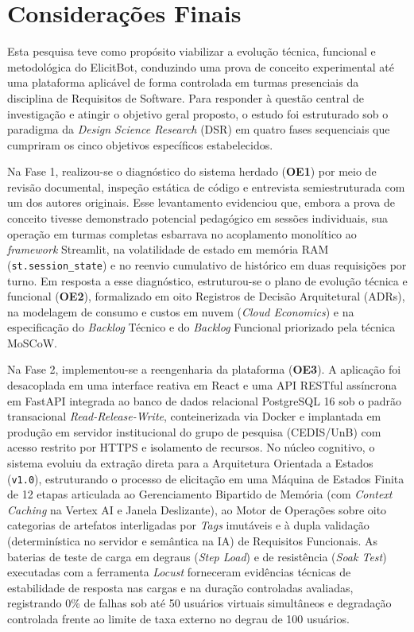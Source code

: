\chapter{Considerações Finais}
\label{cap:consideracoes_finais}

Esta pesquisa teve como propósito viabilizar a evolução técnica, funcional e metodológica do ElicitBot, conduzindo uma prova de conceito experimental até uma plataforma aplicável de forma controlada em turmas presenciais da disciplina de Requisitos de Software. Para responder à questão central de investigação e atingir o objetivo geral proposto, o estudo foi estruturado sob o paradigma da \textit{Design Science Research} (DSR) em quatro fases sequenciais que cumpriram os cinco objetivos específicos estabelecidos.

Na Fase 1, realizou-se o diagnóstico do sistema herdado (\textbf{OE1}) por meio de revisão documental, inspeção estática de código e entrevista semiestruturada com um dos autores originais. Esse levantamento evidenciou que, embora a prova de conceito tivesse demonstrado potencial pedagógico em sessões individuais, sua operação em turmas completas esbarrava no acoplamento monolítico ao \textit{framework} Streamlit, na volatilidade de estado em memória RAM (\texttt{st.session\_\allowbreak state}) e no reenvio cumulativo de histórico em duas requisições por turno. Em resposta a esse diagnóstico, estruturou-se o plano de evolução técnica e funcional (\textbf{OE2}), formalizado em oito Registros de Decisão Arquitetural (ADRs), na modelagem de consumo e custos em nuvem (\textit{Cloud Economics}) e na especificação do \textit{Backlog} Técnico e do \textit{Backlog} Funcional priorizado pela técnica MoSCoW.

Na Fase 2, implementou-se a reengenharia da plataforma (\textbf{OE3}). A aplicação foi desacoplada em uma interface reativa em React e uma API RESTful assíncrona em FastAPI integrada ao banco de dados relacional PostgreSQL 16 sob o padrão transacional \textit{Read-Release-Write}, conteinerizada via Docker e implantada em produção em servidor institucional do grupo de pesquisa (CEDIS/UnB) com acesso restrito por HTTPS e isolamento de recursos. No núcleo cognitivo, o sistema evoluiu da extração direta para a Arquitetura Orientada a Estados (\texttt{v1.0}), estruturando o processo de elicitação em uma Máquina de Estados Finita de 12 etapas articulada ao Gerenciamento Bipartido de Memória (com \textit{Context Caching} na Vertex AI e Janela Deslizante), ao Motor de Operações sobre oito categorias de artefatos interligadas por \textit{Tags} imutáveis e à dupla validação (determinística no servidor e semântica na IA) de Requisitos Funcionais. As baterias de teste de carga em degraus (\textit{Step Load}) e de resistência (\textit{Soak Test}) executadas com a ferramenta \textit{Locust} forneceram evidências técnicas de estabilidade de resposta nas cargas e na duração controladas avaliadas, registrando 0\% de falhas sob até 50 usuários virtuais simultâneos e degradação controlada frente ao limite de taxa externo no degrau de 100 usuários.

